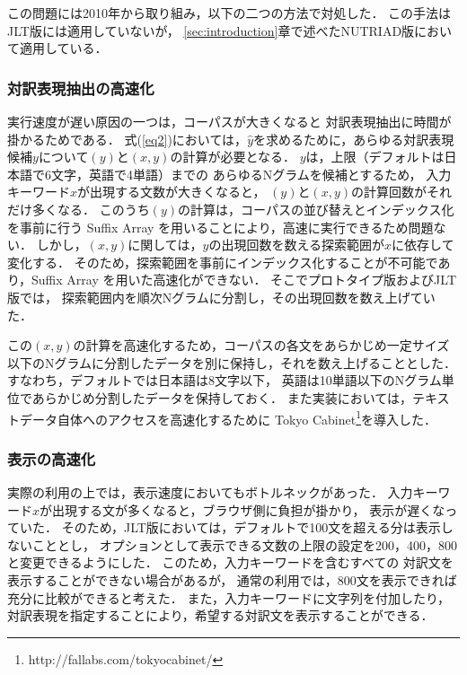 \documentclass[japanese]{jnlp_1.4}
\newcommand{\freq}{}
\begin{document}
この問題には2010年から取り組み，以下の二つの方法で対処した．
この手法はJLT版には適用していないが，
\ref{sec:introduction}章で述べたNUTRIAD版において適用している．


\subsubsection{対訳表現抽出の高速化}

実行速度が遅い原因の一つは，コーパスが大きくなると
対訳表現抽出に時間が掛かるためである．
式(\ref{eq2})においては，$\hat{y}$を求めるために，あらゆる対訳表現候補$y$について$\freq(y)$と$\freq(x,y)$の計算が必要となる．
$y$は，上限（デフォルトは日本語で6文字，英語で4単語）までの
あらゆるNグラムを候補とするため，
入力キーワード$x$が出現する文数が大きくなると，
$\freq(y)$と$\freq(x,y)$の計算回数がそれだけ多くなる．
このうち$\freq(y)$の計算は，コーパスの並び替えとインデックス化を事前に行う Suffix Array を用いることにより，高速に実行できるため問題ない．
しかし，$\freq(x,y)$に関しては，$y$の出現回数を数える探索範囲が$x$に依存して変化する．
そのため，探索範囲を事前にインデックス化することが不可能であり，Suffix Array を用いた高速化ができない．
そこでプロトタイプ版およびJLT版では，
探索範囲内を順次Nグラムに分割し，その出現回数を数え上げていた．

この$\freq(x,y)$の計算を高速化するため，コーパスの各文をあらかじめ一定サイズ以下のNグラムに分割したデータを別に保持し，それを数え上げることとした．
すなわち，デフォルトでは日本語は8文字以下，
英語は10単語以下のNグラム単位であらかじめ分割したデータを保持しておく．
また実装においては，テキストデータ自体へのアクセスを高速化するために Tokyo Cabinet\footnote{http://fallabs.com/tokyocabinet/}を導入した．


\subsubsection{表示の高速化}

実際の利用の上では，表示速度においてもボトルネックがあった．
入力キーワード$x$が出現する文が多くなると，ブラウザ側に負担が掛かり，
表示が遅くなっていた．
そのため，JLT版においては，デフォルトで100文を超える分は表示しないこととし，
オプションとして表示できる文数の上限の設定を200，400，800と変更できるようにした．
このため，入力キーワードを含むすべての
対訳文を表示することができない場合があるが，
通常の利用では，800文を表示できれば充分に比較ができると考えた．
また，入力キーワードに文字列を付加したり，
対訳表現を指定することにより，希望する対訳文を表示することができる．
\end{document}
